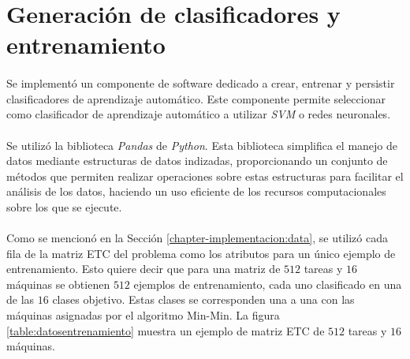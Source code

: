\section{Generación de clasificadores y entrenamiento} \label{chapter-implementacion:clasificadores}

\paragraph{} Se implementó un componente de software dedicado a crear, entrenar y persistir clasificadores de aprendizaje automático.
Este componente permite seleccionar como clasificador de aprendizaje automático a utilizar \textit{SVM} o redes neuronales.

\paragraph{} Se utilizó la biblioteca \textit{Pandas} \cite{bib-pandas} de \textit{Python}.
Esta biblioteca simplifica el manejo de datos mediante estructuras de datos indizadas, proporcionando un conjunto de métodos que permiten realizar operaciones sobre estas estructuras para facilitar el análisis de los datos, haciendo un uso eficiente de los recursos computacionales sobre los que se ejecute.

\paragraph{} Como se mencionó en la Sección \ref{chapter-implementacion:data}, se utilizó cada fila de la matriz ETC del problema como los atributos para un único ejemplo de entrenamiento.
Esto quiere decir que para una matriz de $512$ tareas y $16$ máquinas se obtienen $512$ ejemplos de entrenamiento, cada uno clasificado en una de las $16$ clases objetivo.
Estas clases se corresponden una a una con las máquinas asignadas por el algoritmo Min-Min.
La figura \ref{table:datosentrenamiento} muestra un ejemplo de matriz ETC de $512$ tareas y $16$ máquinas.

